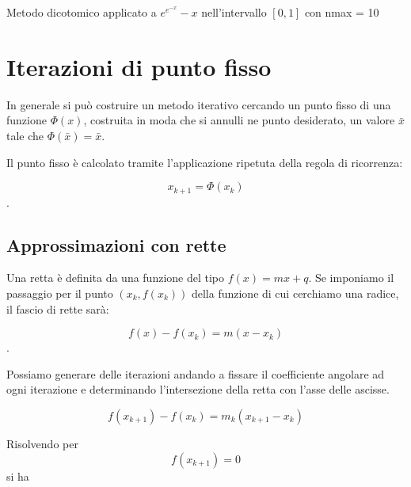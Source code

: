 \documentclass[10pt]{article}
\begin{document}
\begin{table}
    \begin{center}
    \end{center}        
    \caption[]{Metodo dicotomico applicato a $e^{e^{-x}}-x$ nell'intervallo $[0, 1]$ con nmax = 10}
\end{table}

\section{Iterazioni di punto fisso}

In generale si può costruire un metodo iterativo cercando un punto fisso di una funzione $\Phi(x)$,
costruita in moda che si annulli ne punto desiderato, un valore $\bar{x}$ tale che $\Phi(\bar{x}) = \bar{x}$.

Il punto fisso è calcolato tramite l'applicazione ripetuta della regola di ricorrenza:

$$x_{k+1} = \Phi(x_k)$$.

\subsection{Approssimazioni con rette}

Una retta è definita da una funzione del tipo $f(x) = m x + q$.
Se imponiamo il passaggio per il punto $(x_k, f(x_k))$ della funzione di cui cerchiamo una radice, il fascio di rette sarà:

$$f(x) - f(x_k) = m (x - x_k)$$.

Possiamo generare delle iterazioni andando a fissare il coefficiente angolare ad ogni iterazione e determinando l'intersezione della retta con l'asse delle ascisse.

$$f(x_{k+1}) - f(x_k) = m_k (x_{k+1} - x_k)$$

Risolvendo per $$f(x_{k+1}) = 0$$ si ha
\end{document}
